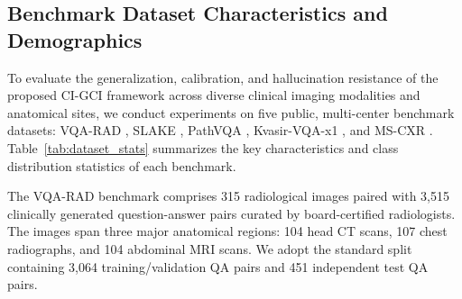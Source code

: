 \documentclass[journal,twoside,web]{ieeecolor}
\begin{document}
\subsection{Benchmark Dataset Characteristics and Demographics}
To evaluate the generalization, calibration, and hallucination resistance of the proposed CI-GCI framework across diverse clinical imaging modalities and anatomical sites, we conduct experiments on five public, multi-center benchmark datasets: VQA-RAD \cite{lau2018}, SLAKE \cite{liu2021}, PathVQA \cite{he2020pathvqa}, Kvasir-VQA-x1 \cite{jha2023}, and MS-CXR \cite{boecking2022}. Table~\ref{tab:dataset_stats} summarizes the key characteristics and class distribution statistics of each benchmark.

\begin{table}[t]
\caption{Benchmark Dataset Statistics and Clinical Characteristics}
\label{tab:dataset_stats}
\centering
{}
\end{table}

The VQA-RAD benchmark \cite{lau2018} comprises 315 radiological images paired with 3,515 clinically generated question-answer pairs curated by board-certified radiologists. The images span three major anatomical regions: 104 head CT scans, 107 chest radiographs, and 104 abdominal MRI scans. We adopt the standard split containing 3,064 training/validation QA pairs and 451 independent test QA pairs.
\end{document}
